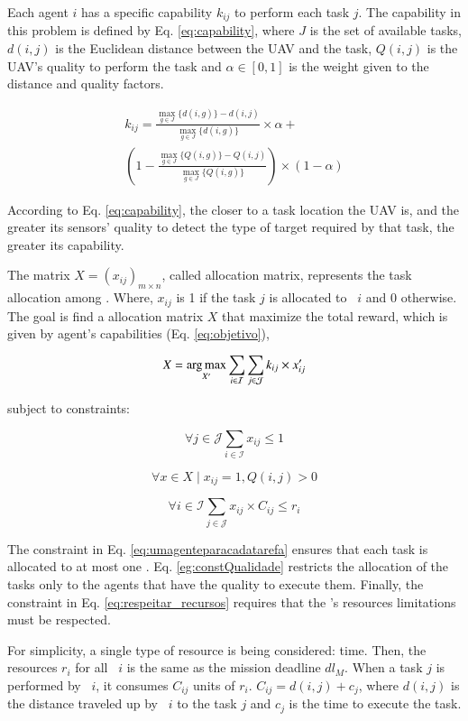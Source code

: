 Each agent $i$ has a specific capability $k_{ij}$ to perform each task $j$. The capability in this problem is defined by Eq. \ref{eq:capability}, where 
$J$ is the set of available tasks, $d(i,j)$ is the Euclidean distance between the UAV and the task, $Q(i,j)$ is the UAV's quality to perform the task and $\alpha \in [0,1]$  is the weight given to the distance and quality factors.

\begin{equation} \label{eq:capability}
\begin{split}
k_{ij} = \frac{\max_{g \in J} \{d(i,g)\} - d(i,j)}{\max_{g \in J} \{d(i,g)\}} \times \alpha + \\
(1 - \frac{\max_{g \in J} \{Q(i,g)\} - Q(i,j)}{\max_{g \in J} \{Q(i,g)\}}) \times (1-\alpha)
\end{split}
\end{equation}

According to Eq. \ref{eq:capability}, the closer to a task location the UAV is, and the greater its sensors' quality to detect the type of target required by that task, the greater its capability.

The matrix $X = (x_{ij})_{m \times n}$, called allocation matrix, represents the task allocation among \uavs. Where, $x_{ij}$ is 1 if the task $j$ is allocated to \uav\ $i$ and $0$ otherwise. 
The goal is find a allocation matrix $X$ that maximize the total reward, which is given by agent's capabilities (Eq. \ref{eq:objetivo}),

\begin{equation} \label{eq:objetivo}
X = \operatorname*{arg\,max}_{X'} \sum_{i \in \mathcal{I}}\sum_{j \in \mathcal{J}} k_{ij} \times x'_{ij}
\end{equation}

subject to constraints:

\begin{equation} \label{eq:umagenteparacadatarefa}
\forall j \in \mathcal{J} \sum_{i \in \mathcal{I}} x_{ij} \leq 1
\end{equation}

\begin{equation} \label{eg:constQualidade}
\forall x \in X \mid x_{ij} = 1, Q(i,j) > 0 
\end{equation}

\begin{equation} \label{eq:respeitar_recursos}
\forall i \in \mathcal{I} \sum_{j \in \mathcal{J}} x_{ij} \times C_{ij} \leq r_i
\end{equation}

The constraint in Eq. \ref{eq:umagenteparacadatarefa} ensures that each task is allocated to at most one \uav. Eq. \ref{eg:constQualidade} restricts the allocation of the tasks only to the agents that have the quality to execute them. 
Finally, the constraint in Eq. \ref{eq:respeitar_recursos} requires that the \uav's resources limitations must be respected.

For simplicity, a single type of resource is being considered: time. Then, the resources $r_i$ for all \uav\ $i$ is the same as the mission deadline $dl_M$. When a task $j$ is performed by \uav\ $i$, it consumes $C_{ij}$ units of $r_i$. $C_{ij} = d(i,j) + c_j$, where $d(i,j)$ is the distance traveled up by \uav\ $i$ to the task $j$ and $c_j$ is the time to execute the task.

